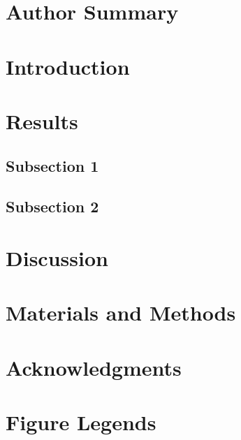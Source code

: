 \documentclass[10pt]{article}
\begin{document}
\section*{Author Summary}


\section*{Introduction}

\section*{Results}

\subsection*{Subsection 1}

\subsection*{Subsection 2}

\section*{Discussion}
\cite{Mizuseki 2012}


\section*{Materials and Methods}

\section*{Acknowledgments}




\section*{Figure Legends}
\end{document}
